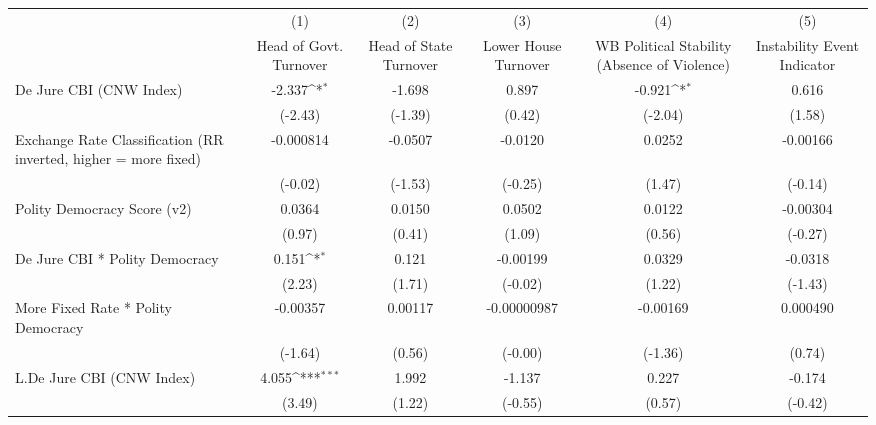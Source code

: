 {
\def\sym#1{\ifmmode^{#1}\else\(^{#1}\)\fi}
\begin{longtable}{l*{5}{c}}
\hline\hline\endfirsthead\hline\endhead\hline\endfoot\endlastfoot
                &\multicolumn{1}{c}{(1)}&\multicolumn{1}{c}{(2)}&\multicolumn{1}{c}{(3)}&\multicolumn{1}{c}{(4)}&\multicolumn{1}{c}{(5)}\\
                &\multicolumn{1}{c}{Head of Govt. Turnover}&\multicolumn{1}{c}{Head of State Turnover}&\multicolumn{1}{c}{Lower House Turnover}&\multicolumn{1}{c}{WB Political Stability (Absence of Violence)}&\multicolumn{1}{c}{Instability Event Indicator}\\
\hline
De Jure CBI (CNW Index)&   -2.337\sym{*}  &   -1.698         &    0.897         &   -0.921\sym{*}  &    0.616         \\
                &  (-2.43)         &  (-1.39)         &   (0.42)         &  (-2.04)         &   (1.58)         \\
[1em]
Exchange Rate Classification (RR inverted, higher = more fixed)&-0.000814         &  -0.0507         &  -0.0120         &   0.0252         & -0.00166         \\
                &  (-0.02)         &  (-1.53)         &  (-0.25)         &   (1.47)         &  (-0.14)         \\
[1em]
Polity Democracy Score (v2)&   0.0364         &   0.0150         &   0.0502         &   0.0122         & -0.00304         \\
                &   (0.97)         &   (0.41)         &   (1.09)         &   (0.56)         &  (-0.27)         \\
[1em]
De Jure CBI * Polity Democracy&    0.151\sym{*}  &    0.121         & -0.00199         &   0.0329         &  -0.0318         \\
                &   (2.23)         &   (1.71)         &  (-0.02)         &   (1.22)         &  (-1.43)         \\
[1em]
More Fixed Rate * Polity Democracy& -0.00357         &  0.00117         &-0.00000987         & -0.00169         & 0.000490         \\
                &  (-1.64)         &   (0.56)         &  (-0.00)         &  (-1.36)         &   (0.74)         \\
[1em]
L.De Jure CBI (CNW Index)&    4.055\sym{***}&    1.992         &   -1.137         &    0.227         &   -0.174         \\
                &   (3.49)         &   (1.22)         &  (-0.55)         &   (0.57)         &  (-0.42)         \\

\end{longtable}}
